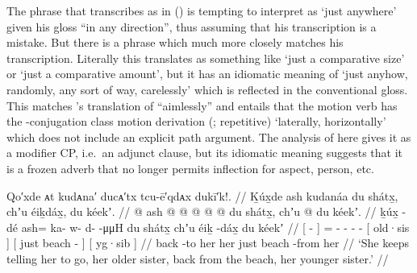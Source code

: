 The phrase that \citeauthor{swanton:1909} transcribes as  in (\lastx) is tempting to interpret as  ‘just anywhere’ given his gloss “in any direction”, thus assuming that his transcription is a mistake.
But there is a phrase  which much more closely matches his transcription.
Literally this translates as something like ‘just a comparative size’ or ‘just a comparative amount’, but it has an idiomatic meaning of ‘just anyhow, randomly, any sort of way, carelessly’ which is reflected in the conventional gloss.
This matches \citeauthor{swanton:1909}’s translation of “aimlessly” and entails that the motion verb has the -conjugation class motion derivation (;  repetitive) ‘laterally, horizontally’ which does not include an explicit path argument.
The analysis of  here gives it as a modifier CP, i.e.\ an adjunct clause, but its idiomatic meaning suggests that it is a frozen adverb that no longer permits inflection for aspect, person, etc.

\ex\label{ex:92-60-tell-to-go-back}%
%
\begingl
	\glpreamble	Qo′xde ᴀt kudᴀna′ ducᴀ′tx tcu-ē′qdᴀx dukī′k!. //
	\glpreamble	Ḵúx̱de ash kudanáa du shátx̱, chʼu éiḵdáx̱, du kéekʼ. //
	\gla	{}  @ {} {}
		ash @  @ {} @ {} @ {} @ {}
		{} du shátx̱, {}
		{} chʼu  @ {} {}
		{} du kéekʼ. {} //
	\glb	{} ḵúx̱ -dé {}
		ash= ka- w- d-  -μμH
		{} du shátx̱ {}
		{} chʼu éiḵ -dáx̱ {}
		{} du kéekʼ {} //
	\glc	{}[  - {}]
		= - - -  -
		{}[  old·sis {}]
		{}[ just beach - {}]
		{}[  yg·sib {}] //
	\gld 	{} back -to {}
		her  {} {} {} {}
		{} her  {}
		{} just beach -from {}
		{} her  {} //
	\glft	‘She keeps telling her to go, her older sister, back from the beach, her younger sister.’
		//
\endgl
\xe



